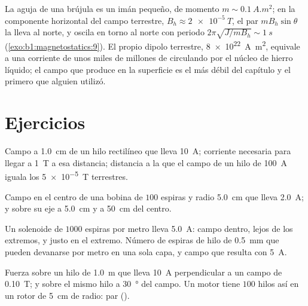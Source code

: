 \begin{example}\label{ex:b1:magnetostatics:compass}
La aguja de una brújula es un imán pequeño, de momento $m \sim \qty{0.1}{A.m^2}$; en la
componente horizontal del campo terrestre, $B_h \approx \qty{2e-5}{T}$, el
par $mB_h\sin\theta$ la lleva al norte, y oscila en torno al norte con
periodo $2\pi\sqrt{J/mB_h} \sim \qty{1}{s}$ (\cref{exo:b1:magnetostatics:9}).
El propio dipolo terrestre, \qty{8e22}{A.m^2}, equivale a una corriente de
unos miles de millones de  circulando por el núcleo de hierro
líquido; el campo que produce en la superficie es el más débil del
capítulo y el primero que alguien utilizó.
\end{example}

\section{Ejercicios}

\begin{exercise}[$\star$]\label{exo:b1:magnetostatics:1}
Campo a \qty{1.0}{cm} de un hilo rectilíneo que lleva \qty{10}{A};
corriente necesaria para llegar a \qty{1}{T} a esa distancia; distancia a
la que el campo de un hilo de \qty{100}{A} iguala los \qty{5e-5}{T} terrestres.
\end{exercise}

\begin{exercise}[$\star$]\label{exo:b1:magnetostatics:2}
Campo en el centro de una bobina de $100$ espiras y radio \qty{5.0}{cm}
que lleva \qty{2.0}{A}; y sobre su eje a \qty{5.0}{cm} y a \qty{50}{cm}
del centro.
\end{exercise}

\begin{exercise}[$\star$]\label{exo:b1:magnetostatics:3}
Un solenoide de $1000$ espiras por metro lleva \qty{5.0}{A}: campo dentro,
lejos de los extremos, y justo en el extremo. Número de espiras de hilo
de \qty{0.5}{mm} que pueden devanarse por metro en una sola capa, y campo
que resulta con \qty{5}{A}.
\end{exercise}

\begin{exercise}[$\star$]\label{exo:b1:magnetostatics:4}
Fuerza sobre un hilo de \qty{1.0}{m} que lleva \qty{10}{A} perpendicular a
un campo de \qty{0.10}{T}; y sobre el mismo hilo a \qty{30}{\degree} del
campo. Un motor tiene $100$ hilos así en un rotor de \qty{5}{cm} de
radio: par ().
\end{exercise}


